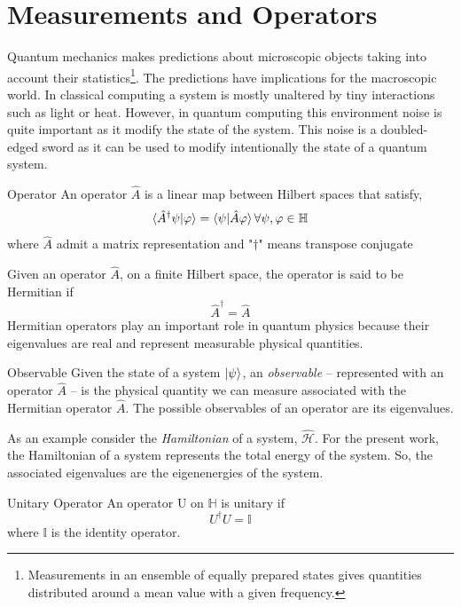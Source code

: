 \section{Measurements and Operators}
Quantum mechanics makes predictions about microscopic objects taking into account their statistics\footnote{Measurements in an ensemble of equally prepared states gives quantities distributed around a mean value with a given frequency.}. The predictions have implications for the macroscopic world. In classical computing a system is mostly unaltered by tiny interactions such as light or heat. However, in quantum computing this environment noise is quite important as it modify the state of the system. This noise is a doubled-edged sword as it can be used to modify intentionally the state of a quantum system.
\begin{definition}{Operator}{}
    An operator $\hat{A}$ is a linear map between Hilbert spaces that satisfy,
    \begin{equation}
        \braket{\hat{A}^{\dagger}\psi|\varphi} = \braket{\psi|\hat{A}\varphi} \forall \psi,\varphi \in \mathbb{H}
    \end{equation}
    where $\hat{A}$ admit a matrix representation and "$\dagger$" means transpose conjugate
\end{definition}
\begin{corollary}{}{}
    Given an operator $\hat{A}$, on a finite Hilbert space, the operator is said to be Hermitian if
    \begin{equation}
        \hat{A}^{\dagger} = \hat{A}
    \end{equation}
    Hermitian operators play an important role in quantum physics because their eigenvalues are real and represent measurable physical quantities.
\end{corollary}
\begin{definition}{Observable}{}
    Given the state of a system $\ket{\psi}$, an \textit{observable} -- represented with an operator $\hat{A}$ -- is the physical quantity we can measure associated with the Hermitian operator $\hat{A}$. The possible observables of an operator are its eigenvalues.
\end{definition}
As an example consider the \textit{Hamiltonian} of a system, $\hat{\mathcal{H}}$. For the present work, the Hamiltonian of a system represents the total energy of the system. So, the associated eigenvalues are the eigenenergies of the system.  
\begin{definition}{Unitary Operator}{}
    An operator U on $\mathbb{H}$ is unitary if
    \begin{equation}
        U^{\dagger}U =\mathbb{I}
    \end{equation}
where $\mathbb{I}$ is the identity operator.
\end{definition}
